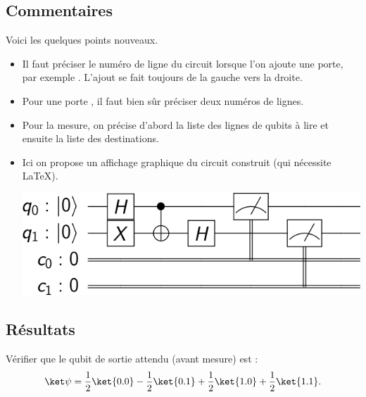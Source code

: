 \documentclass[11pt,class=report,crop=false]{standalone}
\begin{document}
\subsection{Commentaires}

Voici les quelques points nouveaux.
\begin{itemize}
  \item Il faut préciser le numéro de ligne du circuit lorsque l'on ajoute une porte, par exemple . L'ajout se fait toujours de la gauche vers la droite.
  \item Pour une porte , il faut bien sûr préciser deux numéros de lignes.
  \item Pour la mesure, on précise d'abord la liste des lignes de qubits à lire et ensuite la liste des destinations.
  \item Ici on propose un affichage graphique du circuit construit (qui nécessite LaTeX).
  
  \medskip
  
\begin{center}
\includegraphics[scale=\myscale,scale=0.4]{figures/fig-circuit-latex}
\end{center}

\end{itemize}  

\subsection{Résultats}


Vérifier que le qubit de sortie attendu (avant mesure) est :
$$\ket\psi = \frac12\ket{0.0}-\frac12\ket{0.1}+\frac12\ket{1.0}+\frac12\ket{1.1}.$$
\end{document}
